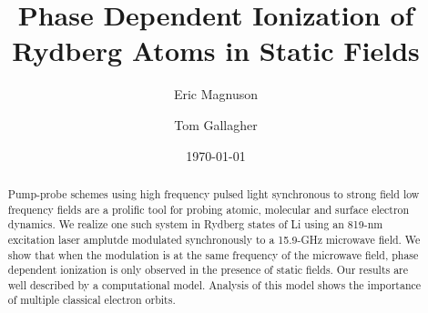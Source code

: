 \documentclass[aps,pra,preprint,groupedaddress]{revtex4-1}
\begin{document}

\title{Phase Dependent Ionization of Rydberg Atoms in Static Fields}


\author{Eric Magnuson}
\author{Tom Gallagher}


\date{\today}

\begin{abstract}
Pump-probe schemes using high frequency pulsed light synchronous to strong field low frequency fields are a prolific tool for probing atomic, molecular and surface electron dynamics. We realize one such system in Rydberg states of Li using an 819-nm excitation laser amplutde modulated synchronously to a 15.9-GHz microwave field. We show that when the modulation is at the same frequency of the microwave field, phase dependent ionization is only observed in the presence of static fields. Our results are well described by a computational model. Analysis of this model shows the importance of multiple classical electron orbits.
\end{abstract}

\pacs{}
\end{document}
